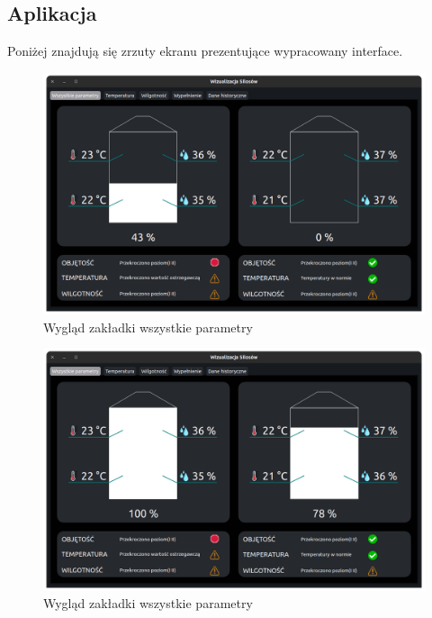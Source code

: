         \subsection{Aplikacja}
            Poniżej znajdują się zrzuty ekranu prezentujące wypracowany interface.
            \begin{figure}[H]
                \centering
                \includegraphics[width = \textwidth]{obrazy/all_param10_05_23.png}
                \caption{Wygląd zakładki wszystkie parametry}
                \label{fig: all param 10 05}
            \end{figure}

            \begin{figure}[H]
                \centering
                \includegraphics[width = \textwidth]{obrazy/all_param_10_05_2.png}
                \caption{Wygląd zakładki wszystkie parametry}
                \label{fig: all param_2 10 05}
            \end{figure}

